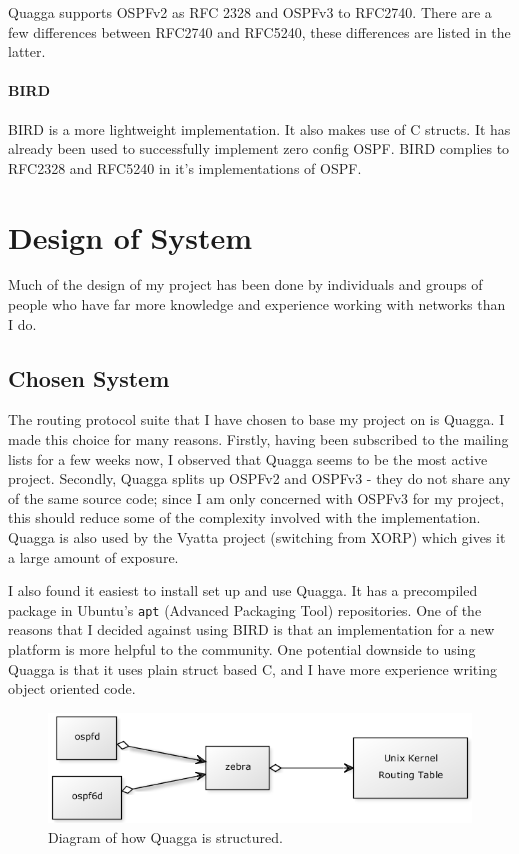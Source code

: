 \documentclass[12pt]{report}
\begin{document}
Quagga supports OSPFv2 as RFC 2328 and OSPFv3 to RFC2740. There are a few
differences between RFC2740 and RFC5240, these differences are listed in the
latter.

\subsubsection{BIRD}
BIRD is a more lightweight implementation. It also makes use of C
structs. It has already been used to successfully implement zero config OSPF. 
BIRD complies to RFC2328 and RFC5240 in it's implementations of OSPF. 

\chapter{Design of System}
Much of the design of my project has been done by individuals and groups of
people who have far more knowledge and experience working with networks than I
do. 

\section{Chosen System}
The routing protocol suite that I have chosen to base my project on is Quagga. I
made this choice for many reasons. Firstly, having been subscribed to the
mailing lists for a few weeks now, I observed that Quagga seems to be the most
active project. Secondly, Quagga splits up OSPFv2 and OSPFv3 - they do not share
any of the same source code; since I am only concerned with OSPFv3 for my
project, this should reduce some of the complexity involved with the
implementation. Quagga is also used by the Vyatta project (switching from XORP)
which gives it a large amount of exposure. 

I also found it easiest to install set up and use Quagga. It has a precompiled
package in Ubuntu's \texttt{apt} (Advanced Packaging Tool) repositories. One of
the reasons that I decided against using BIRD is that an implementation for a
new platform is more helpful to the community. One potential downside to using
Quagga is that it uses plain struct based C, and I have more experience writing
object oriented code. 

\begin{figure}
\centering
\includegraphics[width=\textwidth]{../Diagrams/UML/quaggaZebra.png}
\caption{Diagram of how Quagga is structured.}
\end{figure}
\end{document}
